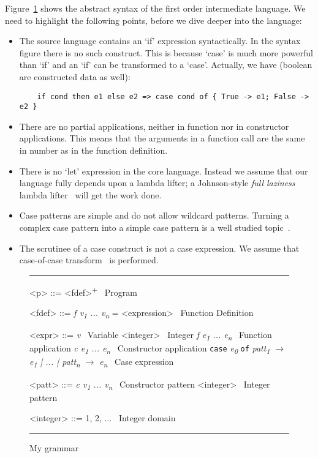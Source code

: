 \documentclass[diploma]{softlab-thesis}
\begin{document}
Figure~\ref{fig:grammar} shows the abstract syntax of 
the first order intermediate language.
We need to highlight the following points, before we dive deeper into the language:
\begin{itemize}
  \item The source language contains an `if' expression syntactically. In the syntax figure there is no such construct.
  This is because `case' is much more powerful than `if' and an `if' can be transformed to a `case'. 
  Actually, we have (boolean are constructed data as well):
  \begin{verbatim}
    if cond then e1 else e2 => case cond of { True -> e1; False -> e2 }
  \end{verbatim}
  \item There are no partial applications, neither in function nor in constructor applications.
  This means that the arguments in a function call are the same in number as in the function definition.
  \item There is no `let' expression in the core language. Instead we assume that our language 
  fully depends upon a lambda lifter; a Johnson-style \textit{full laziness} lambda lifter~\cite{Johnsson:1985:LLT:5280.5292}
  will get the work done.
  \item Case patterns are simple and do not allow wildcard patterns. Turning a complex case pattern into
  a simple case pattern is a well studied topic~\cite{Au85,Wadler87}.
  \item The scrutinee of a case construct is not a case expression. We assume that case-of-case 
  transform~\cite{Jone98} is performed.
\end{itemize}

\begin{figure}[t]
\hrule
\begin{grammar}
    <p> ::= <fdef>\textsuperscript{+} \hfill\ Program

    <fdef> ::= \textit{f v\textsubscript{1} ... v\textsubscript{n}} = <expression> \hfill\ Function Definition

    <expr> ::= \textit{v} \hfill\ Variable
    \alt <integer> \hfill\ Integer
    \alt \textit{f e\textsubscript{1} ... e\textsubscript{n}} \hfill\ Function application
    \alt \textit{c e\textsubscript{1} ... e\textsubscript{n}} \hfill\ Constructor application
    \alt \texttt{case} \textit{e\textsubscript{0}} \texttt{of} \textit{patt\textsubscript{1} $\rightarrow$ e\textsubscript{1} | ... | patt\textsubscript{n} $\rightarrow$ e\textsubscript{n}} \hfill\ Case expression
     
    <patt> ::= \textit{c v\textsubscript{1} ... v\textsubscript{n}} \hfill\ Constructor pattern
    \alt <integer> \hfill\ Integer pattern

    <integer> ::= 1, 2, ... \hfill\ Integer domain

\end{grammar}
\hrule
\caption{My grammar\label{fig:grammar}}
\end{figure}
\end{document}

